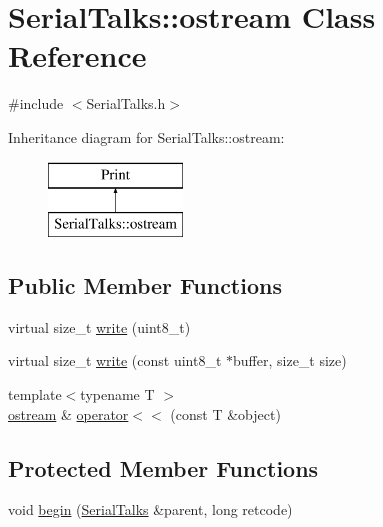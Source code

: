 \hypertarget{class_serial_talks_1_1ostream}{}\section{Serial\+Talks\+:\+:ostream Class Reference}
\label{class_serial_talks_1_1ostream}


{\ttfamily \#include $<$Serial\+Talks.\+h$>$}

Inheritance diagram for Serial\+Talks\+:\+:ostream\+:\begin{figure}[H]
\begin{center}
\leavevmode
\includegraphics[height=2.000000cm]{class_serial_talks_1_1ostream}
\end{center}
\end{figure}
\subsection*{Public Member Functions}
\begin{DoxyCompactItemize}
\item 
virtual size\+\_\+t \hyperlink{class_serial_talks_1_1ostream_ac36ae84bc51baef57f5ec511884dc48e}{write} (uint8\+\_\+t)
\item 
virtual size\+\_\+t \hyperlink{class_serial_talks_1_1ostream_a832eb30e6713d9e2ce2866acbeea0cdc}{write} (const uint8\+\_\+t $\ast$buffer, size\+\_\+t size)
\item 
{\footnotesize template$<$typename T $>$ }\\\hyperlink{class_serial_talks_1_1ostream}{ostream} \& \hyperlink{class_serial_talks_1_1ostream_aa6dadfdfa9e38d5c13e55719f8cd7bfe}{operator$<$$<$} (const T \&object)
\end{DoxyCompactItemize}
\subsection*{Protected Member Functions}
\begin{DoxyCompactItemize}
\item 
void \hyperlink{class_serial_talks_1_1ostream_a3755f0cb78f3d56b593d69b8a360057c}{begin} (\hyperlink{class_serial_talks}{Serial\+Talks} \&parent, long retcode)
\end{DoxyCompactItemize}
